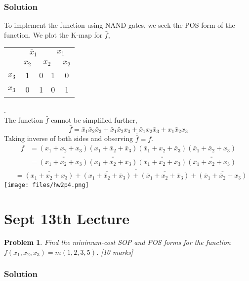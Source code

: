 \documentclass[twocolumn]{article}
\newtheorem{prob}{Problem}
\newcommand{\bx}{\bar{x}}
\begin{document}
\subsubsection*{Solution}
To implement the function using NAND gates, we seek the POS form of the
function. We plot the K-map for $\bar{f}$,
\\
\begin{tabular}{c|c|c|c|c}
  \toprule
  & \multicolumn{2}{c|}{$\bx_1$} & \multicolumn{2}{c}{$x_1$}
  \\
  & $\bx_2$ & \multicolumn{2}{c|}{$x_2$} & $\bx_2$
  \\ \midrule
  $\bx_3$
  & 1 & 0 & 1 & 0
  \\
  $x_3$
  & 0 & 1 & 0 & 1
  \\\bottomrule
\end{tabular}.
\\
The function $\bar{f}$ cannot be simplified further,
\[
  \bar{f} = \bx_1 \bx_2 \bx_3  + \bx_1 \bx_2 x_3  + \bx_1 x_2 \bx_3 + x_1 \bx_2 x_3
\]
Taking inverse of both sides and observing $\overline{\bar{f}} = f$.
{\tiny
\begin{align*}
  f &= (x_1 + x_2 + x_3)(x_1 + \bx_2 + \bx_3)(\bx_1 + x_2 + \bx_3)(\bx_1 + \bx_2 + x_3)
      \\
    &=\overline{\overline{(x_1 + x_2 + x_3)}}\overline{\overline{(x_1 + \bx_2 + \bx_3)}}\overline{\overline{(\bx_1 + x_2 + \bx_3)}}\overline{\overline{(\bx_1 + \bx_2 + x_3)}}
      \end{align*}
}{\tiny
\begin{align*}
  &=\overline{\overline{{(x_1 + x_2 + x_3)}} + {\overline{(x_1 + \bx_2 + \bx_3)}}
  + {\overline{(\bx_1 + x_2 + \bx_3)}} + {\overline{(\bx_1 + \bx_2 + x_3)}}}
\end{align*}
}
\texttt{[image: files/hw2p4.png]}

\section{Sept 13th Lecture}

\begin{prob}
Find the minimum-cost SOP and POS forms for the function $f(x_1 , x_2 , x_3 ) =
m(1, 2, 3, 5)$. \cite[Prob 2.37]{brown2013fundamentals} [10 marks]
\label{prob:237}
\end{prob}

\subsubsection*{Solution}
\end{document}
